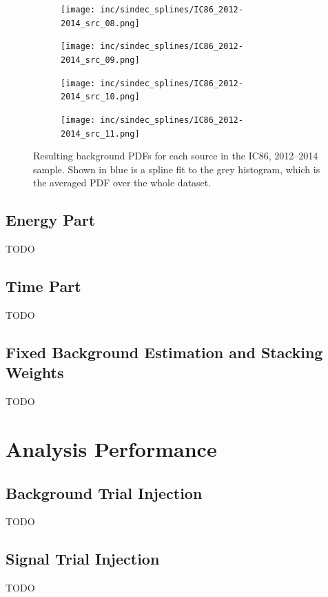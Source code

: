 \begin{enumerate}
\begin{figure}[h]
  \begin{subfigure}[c]{0.24\textwidth}
    \texttt{[image: inc/sindec\_splines/IC86\_2012-2014\_src\_08.png]}
  \end{subfigure}
  \hfill
  \begin{subfigure}[c]{0.24\textwidth}
    \texttt{[image: inc/sindec\_splines/IC86\_2012-2014\_src\_09.png]}
  \end{subfigure}
  \hfill
  \begin{subfigure}[c]{0.24\textwidth}
    \texttt{[image: inc/sindec\_splines/IC86\_2012-2014\_src\_10.png]}
  \end{subfigure}
  \hfill
  \begin{subfigure}[c]{0.24\textwidth}
    \texttt{[image: inc/sindec\_splines/IC86\_2012-2014\_src\_11.png]}
  \end{subfigure}

  \caption{Resulting background PDFs for each source in the IC86, 2012--2014 sample. Shown in blue is a spline fit to the grey histogram, which is the averaged PDF over the whole dataset.}
  \label{fig:model_bg_pdfs}
\end{figure}



\end{enumerate}

\subsection{Energy Part}
TODO

\subsection{Time Part}
TODO

\subsection{Fixed Background Estimation and Stacking Weights}
TODO



\section{Analysis Performance}

\subsection{Background Trial Injection}
TODO

\subsection{Signal Trial Injection}
TODO

